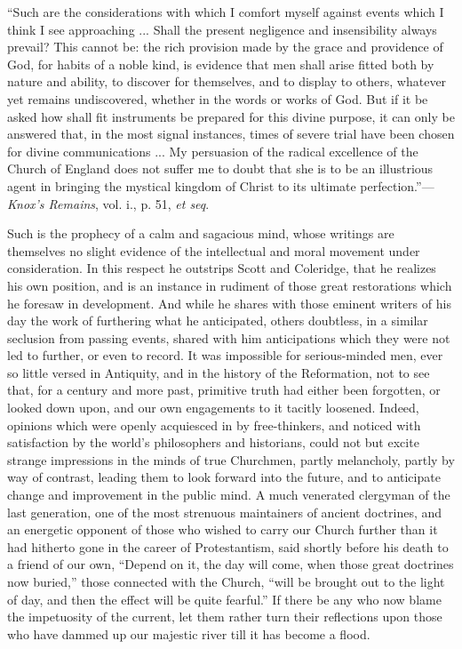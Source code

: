 ``Such
are the considerations with which I comfort myself against events
which I think I see approaching ... Shall the present negligence and
insensibility always prevail? This cannot be: the rich provision made
by the grace and providence of God, for habits of a noble kind, is
evidence that men shall arise fitted both by nature and ability, to
discover for themselves, and to display to others, whatever yet
remains undiscovered, whether in the words or works of God. But if it
be asked how shall fit instruments be prepared for this divine
purpose, it can only be answered that, in the most signal instances,
times of severe trial have been chosen for divine communications ...
My persuasion of the radical excellence of the Church of England does
not suffer me to doubt that she is to be an illustrious agent in
bringing the mystical kingdom of
Christ to its ultimate perfection.''—\emph{Knox's Remains}, vol. i.,
p. 51, \emph{et seq}.

Such is the prophecy of a calm and sagacious
mind, whose writings are themselves no slight evidence of the
intellectual and moral movement under consideration. In this respect
he outstrips Scott and Coleridge, that he realizes his own position,
and is an instance in rudiment of those great restorations which he
foresaw in development. And while he shares with those eminent writers
of his day the work of furthering what he anticipated, others
doubtless, in a similar seclusion from passing events, shared with him
anticipations which they were not led to further, or even to record.
It was impossible for serious-minded men, ever so little versed in
Antiquity, and in the history of the Reformation, not to see that, for
a century and more past, primitive truth had either been forgotten, or
looked down upon, and our own engagements to it tacitly loosened.
Indeed, opinions which were openly acquiesced in by free-thinkers, and
noticed with satisfaction by the world's philosophers and historians,
could not but excite strange impressions in the minds of true
Churchmen, partly melancholy, partly by way of contrast, leading them
to look forward into the future, and to anticipate change and
improvement in the public mind. A much venerated clergyman of the last
generation, one of the most strenuous maintainers of ancient
doctrines, and an energetic opponent of those who wished to carry our
Church further than it had hitherto gone in the career of
Protestantism, said shortly before his death to a friend of our own, ``Depend
on it, the day will come, when those great doctrines now buried,''
those connected with the Church, ``will be brought out to the light of
day, and then the effect will be quite fearful.'' If there be any
who now blame the impetuosity of the current, let them rather turn
their reflections upon those who have dammed up our majestic river
till it has become a flood.

